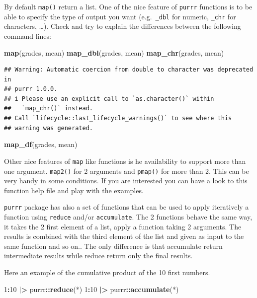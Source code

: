 \documentclass[
]{book}
\newenvironment{Shaded}{\begin{snugshade}}{\end{snugshade}}
\newcommand{\AttributeTok}[1]{\textcolor[rgb]{0.13,0.29,0.53}{#1}}
\newcommand{\DecValTok}[1]{\textcolor[rgb]{0.00,0.00,0.81}{#1}}
\newcommand{\FunctionTok}[1]{\textcolor[rgb]{0.13,0.29,0.53}{\textbf{#1}}}
\newcommand{\NormalTok}[1]{#1}
\newcommand{\SpecialCharTok}[1]{\textcolor[rgb]{0.81,0.36,0.00}{\textbf{#1}}}
\newcommand{\StringTok}[1]{\textcolor[rgb]{0.31,0.60,0.02}{#1}}
\begin{document}
By default \texttt{map()} return a list. One of the nice feature of \texttt{purrr} functions is to be able to specify the type of output you want (e.g.~\texttt{\_dbl} for numeric, \texttt{\_chr} for characters, \ldots).
Check and try to explain the differences between the following command lines:

\begin{Shaded}
\begin{Highlighting}[]
\FunctionTok{map}\NormalTok{(grades, mean)}
\FunctionTok{map\_dbl}\NormalTok{(grades, mean)}
\FunctionTok{map\_chr}\NormalTok{(grades, mean)}
\end{Highlighting}
\end{Shaded}

\begin{verbatim}
## Warning: Automatic coercion from double to character was deprecated in
## purrr 1.0.0.
## i Please use an explicit call to `as.character()` within
##   `map_chr()` instead.
## Call `lifecycle::last_lifecycle_warnings()` to see where this
## warning was generated.
\end{verbatim}

\begin{Shaded}
\begin{Highlighting}[]
\FunctionTok{map\_df}\NormalTok{(grades, mean)}
\end{Highlighting}
\end{Shaded}

Other nice features of \texttt{map} like functions is he availability to support more than one argument.
\texttt{map2()} for 2 arguments and \texttt{pmap()} for more than 2. This can be very handy in some conditions.
If you are interested you can have a look to this function help file and play with the examples.

\texttt{purrr} package has also a set of functions that can be used to apply iteratively a function using \texttt{reduce} and/or \texttt{accumulate}. The 2 functions behave the same way, it takes the 2 first element of a list, apply a function taking 2 arguments. The results is combined with the third element of the list and given as input to the same function and so on.. The only difference is that accumulate return intermediate results while reduce return only the final results.

Here an example of the cumulative product of the 10 first numbers.

\begin{Shaded}
\begin{Highlighting}[]
\DecValTok{1}\SpecialCharTok{:}\DecValTok{10} \SpecialCharTok{|\textgreater{}}\NormalTok{ purrr}\SpecialCharTok{::}\FunctionTok{reduce}\NormalTok{(}\StringTok{\textasciigrave{}}\AttributeTok{*}\StringTok{\textasciigrave{}}\NormalTok{)}
\DecValTok{1}\SpecialCharTok{:}\DecValTok{10} \SpecialCharTok{|\textgreater{}}\NormalTok{ purrr}\SpecialCharTok{::}\FunctionTok{accumulate}\NormalTok{(}\StringTok{\textasciigrave{}}\AttributeTok{*}\StringTok{\textasciigrave{}}\NormalTok{)}
\end{Highlighting}
\end{Shaded}
\end{document}
